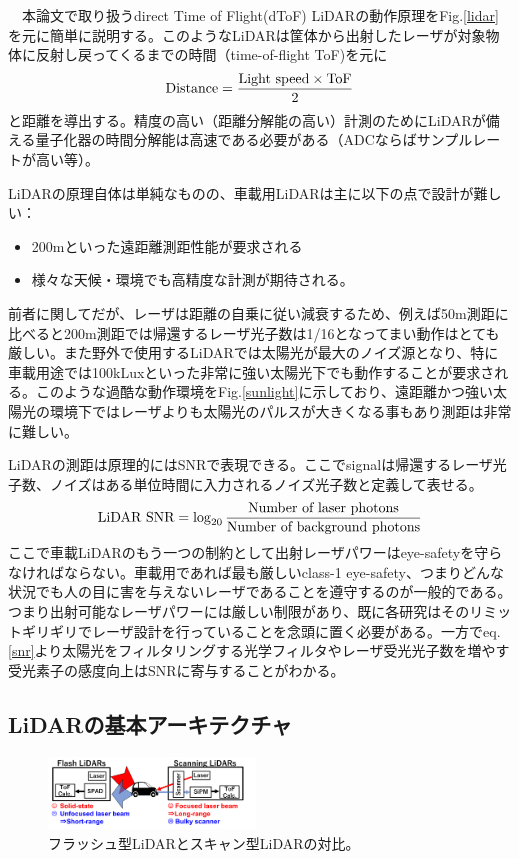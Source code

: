 \documentclass[twocolumn, 11pt, a4j]{article}
\begin{document}
　本論文で取り扱うdirect Time of Flight(dToF) LiDARの動作原理をFig.\ref{lidar}を元に簡単に説明する。このようなLiDARは筐体から出射したレーザが対象物体に反射し戻ってくるまでの時間（time-of-flight ToF)を元に
\begin{eqnarray}
    \centering
    \textrm{Distance} = \frac{\textrm{Light speed} \times \textrm{ToF}}{2}
    \label{dist}
\end{eqnarray}
と距離を導出する。精度の高い（距離分解能の高い）計測のためにLiDARが備える量子化器の時間分解能は高速である必要がある（ADCならばサンプルレートが高い等）。

LiDARの原理自体は単純なものの、車載用LiDARは主に以下の点で設計が難しい：
\begin{itemize}
\item 200mといった遠距離測距性能が要求される
\item 様々な天候・環境でも高精度な計測が期待される。
\end{itemize}
前者に関してだが、レーザは距離の自乗に従い減衰するため、例えば50m測距に比べると200m測距では帰還するレーザ光子数は1/16となってまい動作はとても厳しい。また野外で使用するLiDARでは太陽光が最大のノイズ源となり、特に車載用途では100kLuxといった非常に強い太陽光下でも動作することが要求される。このような過酷な動作環境をFig.\ref{sunlight}に示しており、遠距離かつ強い太陽光の環境下ではレーザよりも太陽光のパルスが大きくなる事もあり測距は非常に難しい。

LiDARの測距は原理的にはSNRで表現できる。ここでsignalは帰還するレーザ光子数、ノイズはある単位時間に入力されるノイズ光子数と定義して表せる\cite{yoshioka201820}。
\begin{eqnarray}
    \centering
    \textrm{LiDAR SNR} = \log_{20}{\frac{\textrm{Number of laser photons}}{\textrm{Number of background photons}}}
    \label{snr}
\end{eqnarray}
ここで車載LiDARのもう一つの制約として出射レーザパワーはeye-safetyを守らなければならない。車載用であれば最も厳しいclass-1 eye-safety、つまりどんな状況でも人の目に害を与えないレーザであることを遵守するのが一般的である。つまり出射可能なレーザパワーには厳しい制限があり、既に各研究はそのリミットギリギリでレーザ設計を行っていることを念頭に置く必要がある。一方でeq.\ref{snr}より太陽光をフィルタリングする光学フィルタやレーザ受光光子数を増やす受光素子の感度向上はSNRに寄与することがわかる。

\subsection{LiDARの基本アーキテクチャ}
\begin{figure}[!t]
\centering
 \includegraphics[width=0.49\textwidth]{figs/flashscan.png}
  \caption{フラッシュ型LiDARとスキャン型LiDARの対比。}
\label{flash}
\end{figure}
\end{document}
